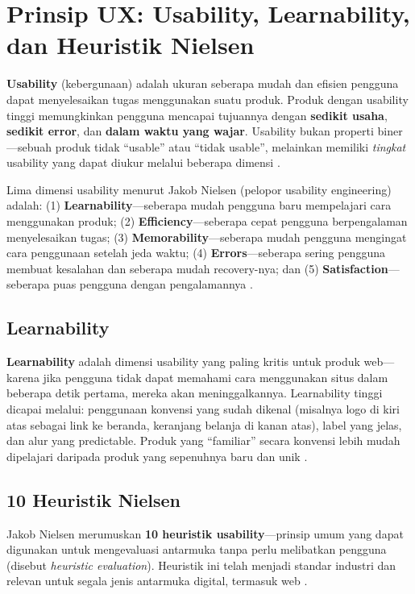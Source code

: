 ﻿\section{Prinsip UX: Usability, Learnability, dan Heuristik Nielsen}

\textbf{Usability} (kebergunaan) adalah ukuran seberapa mudah dan efisien pengguna dapat menyelesaikan tugas menggunakan suatu produk. Produk dengan usability tinggi memungkinkan pengguna mencapai tujuannya dengan \textbf{sedikit usaha}, \textbf{sedikit error}, dan \textbf{dalam waktu yang wajar}. Usability bukan properti biner---sebuah produk tidak ``usable'' atau ``tidak usable'', melainkan memiliki \textit{tingkat} usability yang dapat diukur melalui beberapa dimensi \cite{nngroup}.

Lima dimensi usability menurut Jakob Nielsen (pelopor usability engineering) adalah: (1) \textbf{Learnability}---seberapa mudah pengguna baru mempelajari cara menggunakan produk; (2) \textbf{Efficiency}---seberapa cepat pengguna berpengalaman menyelesaikan tugas; (3) \textbf{Memorability}---seberapa mudah pengguna mengingat cara penggunaan setelah jeda waktu; (4) \textbf{Errors}---seberapa sering pengguna membuat kesalahan dan seberapa mudah recovery-nya; dan (5) \textbf{Satisfaction}---seberapa puas pengguna dengan pengalamannya \cite{nngroup}.

\subsection{Learnability}

\textbf{Learnability} adalah dimensi usability yang paling kritis untuk produk web---karena jika pengguna tidak dapat memahami cara menggunakan situs dalam beberapa detik pertama, mereka akan meninggalkannya. Learnability tinggi dicapai melalui: penggunaan konvensi yang sudah dikenal (misalnya logo di kiri atas sebagai link ke beranda, keranjang belanja di kanan atas), label yang jelas, dan alur yang predictable. Produk yang ``familiar'' secara konvensi lebih mudah dipelajari daripada produk yang sepenuhnya baru dan unik \cite{webdevLearn}.

\subsection{10 Heuristik Nielsen}

Jakob Nielsen merumuskan \textbf{10 heuristik usability}---prinsip umum yang dapat digunakan untuk mengevaluasi antarmuka tanpa perlu melibatkan pengguna (disebut \textit{heuristic evaluation}). Heuristik ini telah menjadi standar industri dan relevan untuk segala jenis antarmuka digital, termasuk web \cite{nngroup}.

